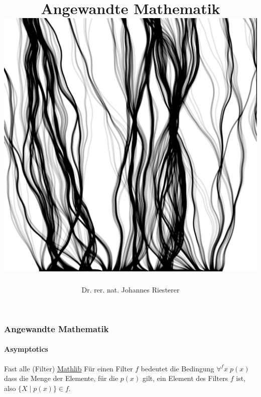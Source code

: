 \documentclass{beamer}
\begin{document}
\title[Angewandte Mathematik] %
{Angewandte Mathematik
\\
\includegraphics[scale=0.15]{images/cover}
}
\subtitle{}
\author[Dr. Johannes Riesterer] %
{Dr.  rer. nat. Johannes Riesterer}

\date[KPT 2004] %
{}

\subject{Angewandte Mathematik}

\frame{\titlepage}

\begin{frame}
    \frametitle{Angewandte Mathematik}
    \framesubtitle{Asymptotics}
    \begin{block}{Fast alle (Filter) \href{https://github.com/leanprover-community/mathlib4/blob/418a5eb7aec3fb639097cb13f74fc031ac4057f2/Mathlib/Order/Filter/Defs.lean\#L243-L244}{Mathlib}}
        Für einen Filter $f$ bedeutet die Bedingung 
        \( \forall^f x \;  p(x) \) 
       dass die Menge der Elemente, für die \( p(x) \) gilt, ein Element des Filters \( f \) ist, also
        \( \{ X \; | \;  p(x) \} \in f \).
    \end{block}
\end{frame}
\end{document}

